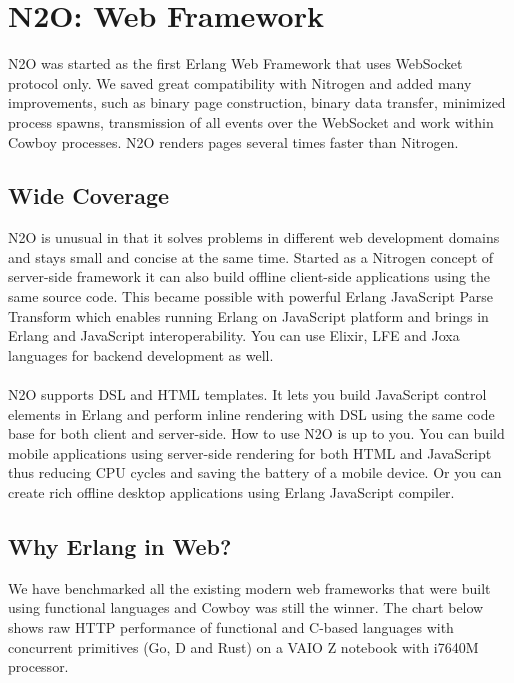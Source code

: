 \section{N2O: Web Framework}

N2O was started as the first Erlang Web Framework
that uses WebSocket protocol only. We saved great compatibility with Nitrogen
and added many improvements, such as binary page construction,
binary data transfer, minimized process spawns, transmission of all events over the WebSocket
and work within Cowboy processes. N2O renders pages several times faster than Nitrogen.

\subsection{Wide Coverage}
N2O is unusual in that it solves problems in different web development domains
and stays small and concise at the same time. Started as a Nitrogen concept
of server-side framework it can also build offline client-side applications
using the same source code. This became possible with powerful Erlang JavaScript Parse
Transform which enables running Erlang on JavaScript platform and brings in Erlang and JavaScript
interoperability. You can use Elixir, LFE and Joxa languages for backend development as well.

\paragraph{}
N2O supports DSL and HTML templates. It lets you build JavaScript
control elements in Erlang and perform inline rendering with DSL using
the same code base for both client and server-side.
How to use N2O is up to you. You can build mobile applications using server-side rendering
for both HTML and JavaScript thus reducing CPU cycles and saving the battery of a mobile device.
Or you can create rich offline desktop applications using Erlang JavaScript compiler.

\newpage
\subsection*{Why Erlang in Web?}
We have benchmarked all the existing modern web frameworks that were built using functional
languages and Cowboy was still the winner. The chart below shows raw HTTP
performance of functional and C-based languages with concurrent
primitives (Go, D and Rust) on a VAIO Z notebook with i7640M processor.

